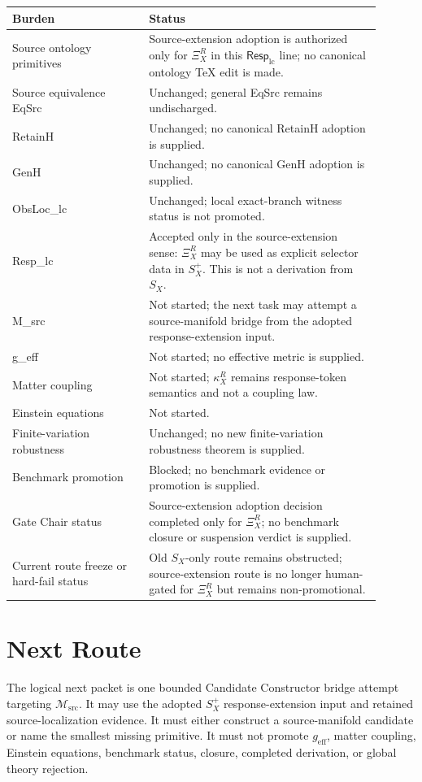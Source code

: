 \documentclass[11pt]{article}
\newcommand{\RespLC}{\mathsf{Resp}_{\mathrm{lc}}}
\newcommand{\Msrc}{\mathcal{M}_{\mathrm{src}}}
\newcommand{\geff}{g_{\mathrm{eff}}}
\newcommand{\XiR}{\Xi_X^R}
\newcommand{\SX}{S_X}
\newcommand{\Splus}{S_X^+}
\begin{document}
\begin{center}
\begin{tabular}{p{0.33\linewidth}p{0.57\linewidth}}
\hline
Burden & Status \\
\hline
Source ontology primitives & Source-extension adoption is authorized only for \(\XiR\) in this \(\RespLC\) line; no canonical ontology TeX edit is made. \\
Source equivalence EqSrc & Unchanged; general EqSrc remains undischarged. \\
RetainH & Unchanged; no canonical RetainH adoption is supplied. \\
GenH & Unchanged; no canonical GenH adoption is supplied. \\
ObsLoc\_lc & Unchanged; local exact-branch witness status is not promoted. \\
Resp\_lc & Accepted only in the source-extension sense: \(\XiR\) may be used as explicit selector data in \(\Splus\). This is not a derivation from \(\SX\). \\
M\_src & Not started; the next task may attempt a source-manifold bridge from the adopted response-extension input. \\
g\_eff & Not started; no effective metric is supplied. \\
Matter coupling & Not started; \(\kappa_X^R\) remains response-token semantics and not a coupling law. \\
Einstein equations & Not started. \\
Finite-variation robustness & Unchanged; no new finite-variation robustness theorem is supplied. \\
Benchmark promotion & Blocked; no benchmark evidence or promotion is supplied. \\
Gate Chair status & Source-extension adoption decision completed only for \(\XiR\); no benchmark closure or suspension verdict is supplied. \\
Current route freeze or hard-fail status & Old \(\SX\)-only route remains obstructed; source-extension route is no longer human-gated for \(\XiR\) but remains non-promotional. \\
\hline
\end{tabular}
\end{center}

\section{Next Route}

The logical next packet is one bounded Candidate Constructor bridge attempt
targeting \(\Msrc\). It may use the adopted \(\Splus\) response-extension
input and retained source-localization evidence. It must either construct a
source-manifold candidate or name the smallest missing primitive. It must
not promote \(\geff\), matter coupling, Einstein equations, benchmark
status, closure, completed derivation, or global theory rejection.
\end{document}
